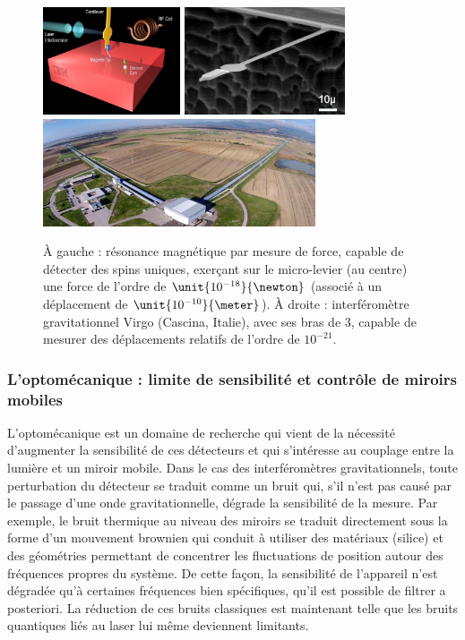 \documentclass[12pt,a4paper]{article}
\begin{document}
\begin{figure}[b]
\center
\includegraphics[height=90pt]{figures/AFM_RM.jpg}
\includegraphics[height=90pt]{figures/AFM_quantilever.png}
\hfill
\includegraphics[height=90pt]{figures/virgo.jpg}
\caption{À gauche : résonance magnétique par mesure de force, capable de détecter des spins uniques, exerçant sur le micro-levier (au centre) une force de l'ordre de $\unit{10^{-18}}{\newton}$ (associé à un déplacement de $\unit{10^{-10}}{\meter}$).
À droite : interféromètre gravitationnel Virgo (Cascina, Italie), avec ses bras de \unit{3}{\kilo\meter}, capable de mesurer des déplacements relatifs de l'ordre de $10^{-21}$.}
\label{fig:displacement_measurement}
\end{figure}

\subsubsection{L'optomécanique : limite de sensibilité et contrôle de miroirs mobiles}

L'optomécanique est un domaine de recherche qui vient de la nécessité d'augmenter la sensibilité de ces détecteurs et qui s'intéresse au couplage entre la lumière et un miroir mobile.
Dans le cas des interféromètres gravitationnels, toute perturbation du détecteur se traduit comme un bruit qui, s'il n'est pas causé par le passage d'une onde gravitationnelle, dégrade la sensibilité de la mesure.
Par exemple, le bruit thermique au niveau des miroirs se traduit directement sous la forme d'un mouvement brownien qui conduit à utiliser des matériaux (silice) et des géométries permettant de concentrer les fluctuations de position autour des fréquences propres du système.
De cette façon, la sensibilité de l'appareil n'est dégradée qu'à certaines fréquences bien spécifiques, qu'il est possible de filtrer a posteriori.
La réduction de ces bruits classiques est maintenant telle que les bruits quantiques liés au laser lui même deviennent limitants.
\end{document}
